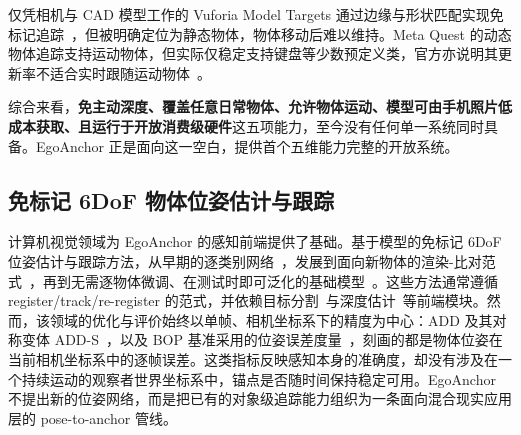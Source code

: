 \documentclass[review]{vgtc}
\begin{document}
仅凭相机与 CAD 模型工作的 Vuforia Model Targets 通过边缘与形状匹配实现免标记追踪~\cite{vuforiaModelTargets}，但被明确定位为静态物体，物体移动后难以维持。Meta Quest 的动态物体追踪支持运动物体，但实际仅稳定支持键盘等少数预定义类，官方亦说明其更新率不适合实时跟随运动物体~\cite{metaDynamicObjectTracker,metaSceneOverview}。

综合来看，\textbf{免主动深度、覆盖任意日常物体、允许物体运动、模型可由手机照片低成本获取、且运行于开放消费级硬件}这五项能力，至今没有任何单一系统同时具备。EgoAnchor 正是面向这一空白，提供首个五维能力完整的开放系统。

\subsection{免标记 6DoF 物体位姿估计与跟踪}
计算机视觉领域为 EgoAnchor 的感知前端提供了基础。基于模型的免标记 6DoF 位姿估计与跟踪方法，从早期的逐类别网络~\cite{posecnn2017,densefusion2019}，发展到面向新物体的渲染-比对范式~\cite{cosypose2020,megapose2022}，再到无需逐物体微调、在测试时即可泛化的基础模型~\cite{foundationpose2023,bundlesdf2023}。这些方法通常遵循 register/track/re-register 的范式，并依赖目标分割~\cite{kirillov2023sam,cutie2024,sam3_2025,yoloe2025}与深度估计~\cite{foundationstereo2025}等前端模块。然而，该领域的优化与评价始终以单帧、相机坐标系下的精度为中心：ADD 及其对称变体 ADD-S~\cite{hinterstoisser2012add,posecnn2017}，以及 BOP 基准采用的位姿误差度量~\cite{hodan2020bop}，刻画的都是物体位姿在当前相机坐标系中的逐帧误差。这类指标反映感知本身的准确度，却没有涉及在一个持续运动的观察者世界坐标系中，锚点是否随时间保持稳定可用。EgoAnchor 不提出新的位姿网络，而是把已有的对象级追踪能力组织为一条面向混合现实应用层的 pose-to-anchor 管线。
\end{document}
